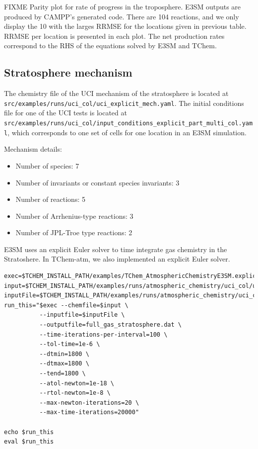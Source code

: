 \documentclass[report, 12pt]{SANDreport}
\begin{document}
FIXME
Parity plot for rate of progress in the troposphere. E3SM outputs are produced by CAMPP’s generated code. There are 104 reactions, and we only display the 10 with the larges RRMSE for the locations given in previous table. RRMSE per location is presented in each plot. The net production rates correspond to the RHS of the equations solved by E3SM and TChem.


\subsection{Stratosphere mechanism}

The chemistry file of the UCI mechanism of the stratosphere is located at \verb|src/examples/runs/uci_col/uci_explicit_mech.yaml|. The initial conditions file for one of the UCI tests is located at \verb|src/examples/runs/uci_col/input_conditions_explicit_part_multi_col.yaml|, which corresponds to one set of cells for one location in an E3SM simulation.

Mechanism details:

\begin{itemize}
    \item Number of species: 7
    \item Number of invariants or constant species invariants: 3
    \item Number of reactions: 5
    \item Number of Arrhenius-type reactions: 3
    \item Number of JPL-Troe type reactions: 2
\end{itemize}

E3SM uses an explicit Euler solver to time integrate gas chemistry in the Stratoshere. In TChem-atm, we also implemented an explicit Euler solver.


\begin{verbatim}
exec=$TCHEM_INSTALL_PATH/examples/TChem_AtmosphericChemistryE3SM.explicit_euler.x
input=$TCHEM_INSTALL_PATH/examples/runs/atmospheric_chemistry/uci_col/uci_explicit_mech.yaml
inputFile=$TCHEM_INSTALL_PATH/examples/runs/atmospheric_chemistry/uci_col/input_conditions_explicit_part_multi_col.yaml
run_this="$exec --chemfile=$input \
          --inputfile=$inputFile \
          --outputfile=full_gas_stratosphere.dat \
          --time-iterations-per-interval=100 \
          --tol-time=1e-6 \
          --dtmin=1800 \
          --dtmax=1800 \
          --tend=1800 \
          --atol-newton=1e-18 \
          --rtol-newton=1e-8 \
          --max-newton-iterations=20 \
          --max-time-iterations=20000"

echo $run_this
eval $run_this
\end{verbatim}
\end{document}
